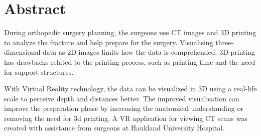 \documentclass[a4paper]{report}
\begin{document}
%
%


\makeatletter
{}
\def\lst@SkipToFirst{%
    \lst@ifmatchrangestart\c@lstnumber=\numexpr-1+\lst@firstline\fi
    \ifnum \lst@lineno<\lst@firstline
        \def\lst@next{\lst@BeginDropInput\lst@Pmode
        \lst@Let{13}\lst@MSkipToFirst
        \lst@Let{10}\lst@MSkipToFirst}%
        \expandafter\lst@next
    \else
        \expandafter\lst@BOLGobble
    \fi}
\makeatother



\titlePage
\pagebreak

\section*{Abstract}
During orthopedic surgery planning, the surgeons use CT images and 3D printing to analyze the fracture and help prepare for the surgery.
Visualising three-dimensional data as 2D images limits how the data is comprehended. 3D printing has drawbacks related to the printing process, such as printing time and the need for support structures.

With Virtual Reality technology, the data can be visualized in 3D using a real-life scale to perceive depth and distances better. The improved visualisation can improve the preparation phase by increasing the anatomical understanding or removing the need for 3d printing.
A VR application for viewing CT scans was created with assistance from surgeons at Haukland University Hospital.
\end{document}
